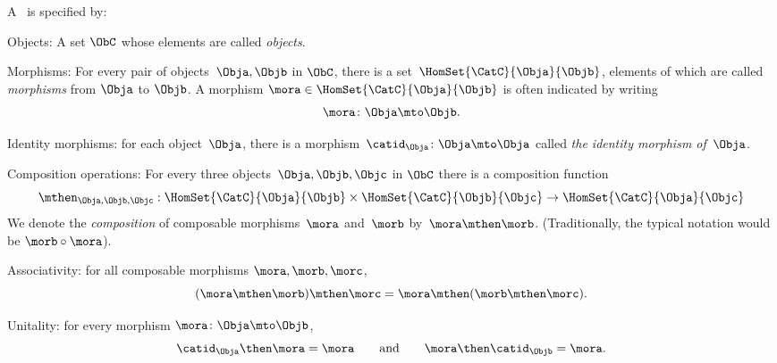 {\begin{forslides}
        
        \begin{ctdefinition}
            \label{def:category-var}
            A \emph{}~\CatC is specified by:
            \begin{body}
                \constit
                \begin{compactenum}
                    \item Objects: A set $\ObC$ whose elements are called \emph{objects}.
                    \item Morphisms: For every pair of objects~$\Obja,\Objb$ in $\ObC$, there is a set~$\HomSet{\CatC}{\Obja}{\Objb}$, elements of which are called \emph{morphisms} from $\Obja$ to $\Objb$. A morphism $\mora \in \HomSet{\CatC}{\Obja}{\Objb}$ is often indicated by writing
                    \begin{equation*}
                        \mora \colon \Obja \mto \Objb.
                    \end{equation*}
                    \item Identity morphisms: for each object~$\Obja$, there is
                    a morphism~$\catid_{\Obja}\colon \Obja \mto \Obja$  called \emph{the identity
                    morphism of~$\Obja$}.
                    \item Composition operations: For every three objects~$\Obja,\Objb,\Objc$ in $\ObC$ there is a composition function
                    \begin{equation*}
                        \mthen_{\Obja,\Objb,\Objc}: \HomSet{\CatC}{\Obja}{\Objb} \times \HomSet{\CatC}{\Objb}{\Objc}\to \HomSet{\CatC}{\Obja}{\Objc}
                    \end{equation*}
                    We denote the \emph{composition} of composable morphisms~$\mora$ and~$\morb$ by~$\mora \mthen \morb$. (Traditionally, the typical notation would be $\morb \circ \mora$).
                
                \end{compactenum}
                \condit
                \begin{compactenum}
                    \item Associativity: for all composable morphisms $\mora, \morb, \morc$,
                    $$ (\mora\mthen \morb)
                    \mthen \morc= \mora \mthen (\morb \mthen \morc).$$
                    \item Unitality: for every morphism $\mora \colon \Obja \mto \Objb$,
                    $$ \catid_{\Obja} \then \mora = \mora \quad \quad \text{and} \quad \quad \mora \then \catid_{\Objb} = \mora. $$
                \end{compactenum}
            \end{body}
        \end{ctdefinition}
        

\end{forslides}}
